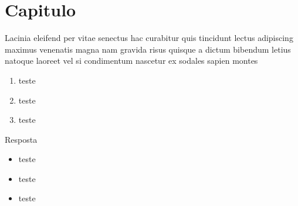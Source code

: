 \hypertarget{capitulo}{%
\section{Capitulo}\label{capitulo}}

Lacinia eleifend per vitae senectus hac curabitur quis tincidunt lectus
adipiscing maximus venenatis magna nam gravida risus quisque a dictum
bibendum letius natoque laoreet vel si condimentum nascetur ex sodales
sapien montes


\begin{enumerate}
\def\labelenumi{\arabic{enumi}.}
\tightlist
\item
  teste
\item
  teste
\item
  teste
\end{enumerate}

Resposta

\begin{itemize}
\item
  teste
\item
  teste
\item
  teste
\end{itemize}
